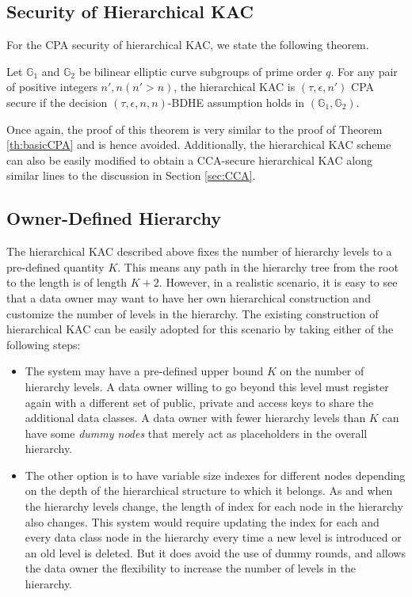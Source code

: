 \subsection{Security of Hierarchical KAC}
\label{subsec:securityhierarchical}

For the CPA security of hierarchical KAC, we state the following theorem.
\begin{Theorem}
\label{th:hierarchicalCPA}
Let $\mathbb{G}_1$ and $\mathbb{G}_2$ be bilinear elliptic curve subgroups of prime order $q$. For any pair of positive integers $n',n (n'>n)$, the hierarchical KAC is $(\tau,\epsilon,n')$ CPA secure if the decision $(\tau,\epsilon,n,n)$-BDHE assumption holds in $(\mathbb{G}_1,\mathbb{G}_2)$.
\end{Theorem}

\noindent Once again, the proof of this theorem is very similar to the proof of Theorem \ref{th:basicCPA} and is hence avoided. Additionally, the hierarchical KAC scheme can also be easily modified to obtain a CCA-secure hierarchical KAC along similar lines to the discussion in Section \ref{sec:CCA}.

\subsection{Owner-Defined Hierarchy}
\label{subsec:owner}

The hierarchical KAC described above fixes the number of hierarchy levels to a pre-defined quantity $K$. This means any path in the hierarchy tree from the root to the length is of length $K+2$. However, in a realistic scenario, it is easy to see that a data owner may want to have her own hierarchical construction and customize the number of levels in the hierarchy. The existing construction of hierarchical KAC can be easily adopted for this scenario by taking either of the following steps:

\begin{itemize}
 \item The system may have a pre-defined upper bound $K$ on the number of hierarchy levels. A data owner willing to go beyond this level must register again with a different set of public, private and access keys to share the additional data classes. A data owner with fewer hierarchy levels than $K$ can have some \emph{dummy nodes} that merely act as placeholders in the overall hierarchy.
 
 \item The other option is to have variable size indexes for different nodes depending on the depth of the hierarchical structure to which it belongs. As and when the hierarchy levels change, the length of index for each node in the hierarchy also changes. This system would require updating the index for each and every data class node in the hierarchy every time a new level is introduced or an old level is deleted. But it does avoid the use of dummy rounds, and allows the data owner the flexibility to increase the number of levels in the hierarchy.
\end{itemize}



